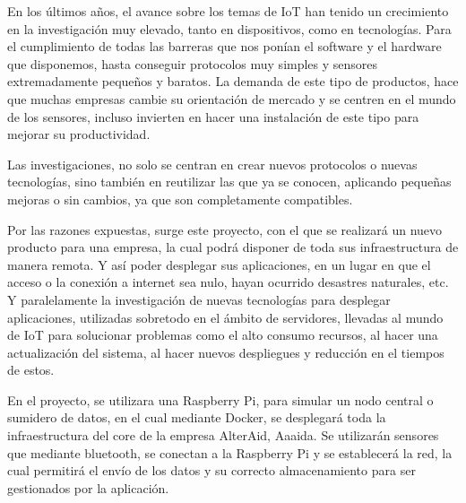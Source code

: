 \documentclass[spanish,final]{setup/eetac_tfc_pfc}
\begin{document}

\beforepreface  


\begin{resum}{10cm}
En los últimos años, el avance sobre los temas de IoT han tenido un crecimiento en la investigación muy elevado, tanto en dispositivos, como en tecnologías. Para el cumplimiento de todas las barreras que nos ponían el software y el hardware que disponemos, hasta conseguir protocolos muy simples y sensores extremadamente pequeños y baratos. La demanda de este tipo de productos, hace que muchas empresas cambie su orientación de mercado y se centren en el mundo de los sensores,  incluso invierten en hacer una instalación de este tipo para mejorar su productividad.  
\newline 

Las investigaciones, no solo se centran en crear nuevos protocolos o nuevas tecnologías, sino también en reutilizar las que ya se conocen, aplicando pequeñas mejoras o sin cambios, ya que son completamente compatibles. 
\newline

Por las razones expuestas, surge este proyecto,  con el que se realizará  un nuevo producto para una empresa, la cual podrá disponer de toda sus infraestructura de manera remota. Y así poder desplegar sus aplicaciones, en un lugar en que el acceso o la conexión a internet sea nulo, hayan ocurrido desastres naturales, etc. Y paralelamente la investigación de nuevas tecnologías para desplegar aplicaciones, utilizadas sobretodo en el ámbito de servidores, llevadas al mundo de IoT para solucionar problemas como el alto consumo recursos, al hacer una actualización del sistema, al hacer nuevos despliegues y reducción en el tiempos de estos.
\newline

En el proyecto, se utilizara una Raspberry Pi, para simular un nodo central o sumidero de datos, en el cual mediante Docker, se desplegará toda la infraestructura del core de la empresa AlterAid, Aaaida. Se utilizarán sensores que mediante bluetooth, se conectan a la Raspberry Pi y se establecerá la red, la cual permitirá el envío de los datos y su correcto almacenamiento para ser gestionados por la aplicación.

\end{resum}
\end{document}
